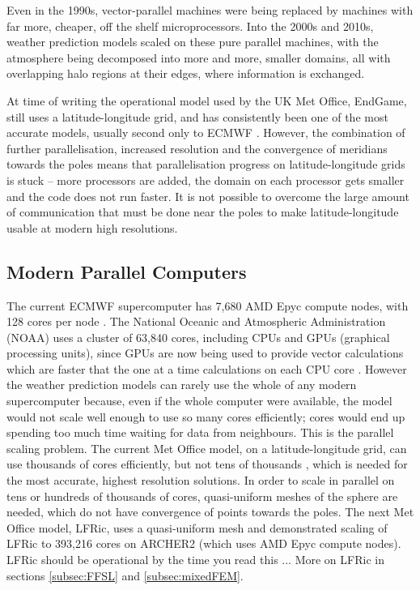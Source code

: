 Even in the 1990s, vector-parallel machines were being replaced by
machines with far more, cheaper, off the shelf microprocessors. Into
the 2000s and 2010s, weather prediction models scaled on these pure
parallel machines, with the atmosphere being decomposed into more
and more, smaller domains, all with overlapping halo regions at their
edges, where information is exchanged.

At time of writing the operational model used by the UK Met Office,
EndGame, still uses a latitude-longitude grid, and has consistently
been one of the most accurate models, usually second only to ECMWF
\citep[eg.][]{HJV+24}. However, the combination of further parallelisation,
increased resolution and the convergence of meridians towards the
poles means that parallelisation progress on latitude-longitude grids
is stuck -- more processors are added, the domain on each processor
gets smaller and the code does not run faster. It is not possible
to overcome the large amount of communication that must be done near
the poles to make latitude-longitude usable at modern high resolutions. 

\subsection{Modern Parallel Computers}

The current ECMWF supercomputer has 7,680 AMD Epyc compute nodes,
with 128 cores per node \citep{ECMWFcomputer26}. The National Oceanic
and Atmospheric Administration (NOAA) uses a cluster of 63,840 cores,
including CPUs and GPUs (graphical processing units), since GPUs are
now being used to provide vector calculations which are faster that
the one at a time calculations on each CPU core \citep{NOAA_HERA26}.
However the weather prediction models can rarely use the whole of
any modern supercomputer because, even if the whole computer were
available, the model would not scale well enough to use so many cores
efficiently; cores would end up spending too much time waiting for
data from neighbours. This is the parallel scaling problem. The current
Met Office model, on a latitude-longitude grid, can use thousands
of cores efficiently, but not tens of thousands \citep{WBB+17}, which
is needed for the most accurate, highest resolution solutions. In
order to scale in parallel on tens or hundreds of thousands of cores,
quasi-uniform meshes of the sphere are needed, which do not have convergence
of points towards the poles. The next Met Office model, LFRic, uses
a quasi-uniform mesh and \citet{BBD+26} demonstrated scaling of LFRic
to 393,216 cores on ARCHER2 (which uses AMD Epyc compute nodes). LFRic
should be operational by the time you read this ... More on LFRic
in sections \ref{subsec:FFSL} and \ref{subsec:mixedFEM}.

